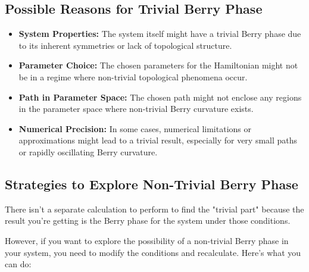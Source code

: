 \documentclass{article}
\begin{document}
\subsection{Possible Reasons for Trivial Berry Phase}

\begin{itemize}
    \item   \textbf{System Properties:} The system itself might have a trivial Berry phase due to its inherent symmetries or lack of topological structure.
    \item   \textbf{Parameter Choice:} The chosen parameters for the Hamiltonian might not be in a regime where non-trivial topological phenomena occur.
    \item   \textbf{Path in Parameter Space:} The chosen path might not enclose any regions in the parameter space where non-trivial Berry curvature exists.
    \item   \textbf{Numerical Precision:} In some cases, numerical limitations or approximations might lead to a trivial result, especially for very small paths or rapidly oscillating Berry curvature.
\end{itemize}

\subsection{Strategies to Explore Non-Trivial Berry Phase}

There isn't a separate calculation to perform to find the "trivial part" because the result you're getting is the Berry phase for the system under those conditions.

However, if you want to explore the possibility of a non-trivial Berry phase in your system, you need to modify the conditions and recalculate. Here's what you can do:
\end{document}
